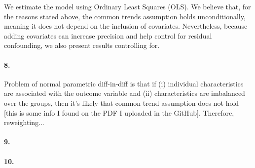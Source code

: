 \documentclass{scrartcl}
\begin{document}
We estimate the model using Ordinary Least Squares (OLS). We believe that, for the reasons stated above, the common trends assumption holds unconditionally, meaning it does not depend on the inclusion of covariates. Nevertheless, because adding covariates can increase precision and help control for residual confounding, we also present results controlling for.



\paragraph*{8.}
Problem of normal parametric diff-in-diff is that if (i) individual characteristics are associated with the outcome variable and (ii) characteristics are imbalanced over the groups, then it's likely that common trend assumption does not hold [this is some info I found on the PDF I uploaded in the GitHub]. Therefore, reweighting...



\paragraph*{9.}


\paragraph*{10.}
\end{document}
